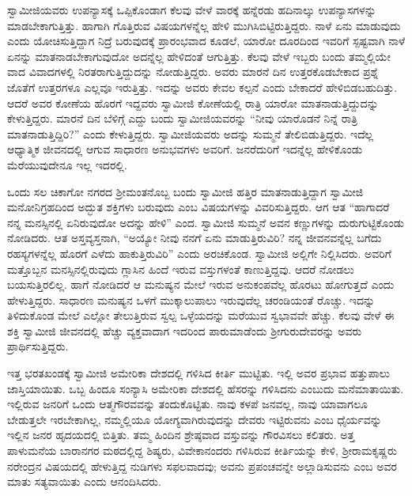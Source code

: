  ಸ್ವಾಮೀಜಿಯವರು ಉಪನ್ಯಾಸಕ್ಕೆ ಒಪ್ಪಿಕೊಂಡಾಗ ಕೆಲವು ವೇಳೆ ವಾರಕ್ಕೆ ಹನ್ನೆರಡು ಹದಿನಾಲ್ಕು ಉಪನ್ಯಾಸಗಳನ್ನು ಮಾಡಬೇಕಾಗುತ್ತಿತ್ತು. ಹಾಗಾಗಿ ಗೊತ್ತಿರುವ ವಿಷಯಗಳನ್ನೆಲ್ಲ ಹೇಳಿ ಮುಗಿಸಿಬಿಟ್ಟಿರುತ್ತಿದ್ದರು. ನಾಳೆ ಏನು ಮಾಡುವುದು ಎಂದು ಯೋಚಿಸುತ್ತಿದ್ದಾಗ ನಿದ್ರೆ ಬರುವುದಕ್ಕೆ ಪ್ರಾರಂಭವಾದ ಕೂಡಲೆ, ಯಾರೋ‌ ದೂರದಿಂದ ಇವರಿಗೆ ಸ್ಪಷ್ಟವಾಗಿ ನಾಳೆ ಏನನ್ನು ಮಾತನಾಡಬೇಕಾಗುವುದೋ ಅದನ್ನೆಲ್ಲ ಹೇಳಿದಂತೆ ಆಗುತ್ತಿತ್ತು. ಕೆಲವು ವೇಳೆ ಇಬ್ಬರು ಬಂದು ತಮ್ಮಲ್ಲಿಯೇ ವಾದ ವಿವಾದಗಳಲ್ಲಿ ನಿರತರಾಗುತ್ತಿದ್ದುದನ್ನು ನೋಡುತ್ತಿದ್ದರು. ಅವರು ಮಾರನೆ ದಿನ ಉತ್ತರಕೊಡಬೇಕಾದ ಪ್ರಶ್ನೆ ಜೊತೆಗೆ ಉತ್ತರಗಳೂ ಎಲ್ಲವೂ ಇರುತ್ತಿತ್ತು. ಇದನ್ನು ಅವರು ಕೇವಲ ಕಲ್ಪನೆ ಎಂದು ಬೇಕಾದರೆ ಹೇಳಿಬಿಡಬಹುದಿತ್ತು. ಆದರೆ ಅವರ ಕೋಣೆಯ ಹೊರಗೆ ಇದ್ದವರು ಸ್ವಾಮೀಜಿ ಕೋಣೆಯಲ್ಲಿ ರಾತ್ರಿ ಯಾರೋ ಮಾತನಾಡುತ್ತಿದ್ದುದನ್ನು ಕೇಳುತ್ತಿದ್ದರು. ಮಾರನೆ ದಿನ ಬೆಳಿಗ್ಗೆ ಎದ್ದು ಬಂದು ಸ್ವಾಮೀಜಿಯವರನ್ನು “ನೀವು ಯಾರೊಡನೆ ನಿನ್ನೆ ರಾತ್ರಿ ಮಾತನಾಡುತ್ತಿದ್ದಿರಿ?” ಎಂದು ಕೇಳುತ್ತಿದ್ದರು. ಸ್ವಾಮೀಜಿಯವರು ಅದನ್ನು ಸುಮ್ಮನೆ ತೇಲಿಬಿಡುತ್ತಿದ್ದರು. ಇದೆಲ್ಲ ಆಧ್ಯಾತ್ಮಿಕ ಜೀವನದಲ್ಲಿ ಆಗುವ ಸಾಧಾರಣ ಅನುಭವಗಳು ಅವರಿಗೆ. ಜನರೆದುರಿಗೆ ಇದನ್ನೆಲ್ಲ ಹೇಳಿಕೊಂಡು ಮೆರೆಯುವುದೇನೂ ಇಲ್ಲ ಇದರಲ್ಲಿ. 

 ಒಂದು ಸಲ ಚಿಕಾಗೋ ನಗರದ ಶ‍್ರೀಮಂತನೊಬ್ಬ ಬಂದು ಸ್ವಾಮೀಜಿ ಹತ್ತಿರ ಮಾತನಾಡುತ್ತಿದ್ದಾಗ ಸ್ವಾಮೀಜಿ ಮನೋನಿಗ್ರಹದಿಂದ ಅದ್ಭುತ ಶಕ್ತಿಗಳು ಬರುವುದು ಎಂಬ ವಿಷಯಗಳನ್ನು ವಿವರಿಸುತ್ತಿದ್ದರು. ಆಗ ಆತ “ಹಾಗಾದರೆ ನನ್ನ ಮನಸ್ಸಿನಲ್ಲಿ ಏನಿರುವುದೋ ಅದನ್ನು ಹೇಳಿ” ಎಂದ. ಸ್ವಾಮೀಜಿ ಸುಮ್ಮನೆ ಅವನ ಕಣ್ಣುಗಳನ್ನು ದುರುಗುಟ್ಟಿಕೊಂಡು ನೋಡಿದರು. ಆತ ಅಸ್ತವ್ಯಸ್ತನಾಗಿ, “ಅಯ್ಯೋ ನೀವು ನನಗೆ ಏನು ಮಾಡುತ್ತಿರುವಿರಿ? ನನ್ನ ಜೀವನವನ್ನೆಲ್ಲ ಬಗೆದು ರಹಸ್ಯಗಳನ್ನೆಲ್ಲ ಹೊರಗೆ ಎಳೆದು ಹಾಕುತ್ತಿರುವಿರಿ” ಎಂದು ಅರಚಿಕೊಂಡ. ಸ್ವಾಮೀಜಿ ಅಲ್ಲಿಗೇ ನಿಲ್ಲಿಸಿದರು. ಅವರಿಗೆ ಮತ್ತೊಬ್ಬನ ಮನಸ್ಸಿನಲ್ಲಿರುವುದು ಗ್ಲಾಸಿನ ಹಿಂದೆ ಇರುವ ವಸ್ತುಗಳಂತೆ ಕಾಣುತ್ತಿದ್ದವು. ಆದರೆ ನೋಡಲು ಬಯಸುತ್ತಿರಲಿಲ್ಲ. ಹಾಗೆ ನೋಡಿದರೆ ಆ ಮನುಷ್ಯನ ಮೇಲೆ ಇರುವ ಅನುಕಂಪವೆಲ್ಲ ಹೊರಟು ಹೋಗುತ್ತದೆ ಎಂದು ಹೇಳುತ್ತಿದ್ದರು. ಸಾಧಾರಣ ಮನುಷ್ಯನ ಒಳಗೆ ಮುಕ್ಕಾಲುಪಾಲು ಇರುವುದೆಲ್ಲ ಚರಂಡಿಯಂತೆ ರೊಚ್ಚು. ಇದನ್ನು ತಿಳಿದುಕೊಂಡ ಮೇಲೆ ಎಲ್ಲೋ ತೇಲುತ್ತಿರುವ ಸ್ವಲ್ಪ ಒಳ್ಳೆಯದನ್ನು ಮರೆಯುವ ಸ್ವಭಾವವೇ ಹೆಚ್ಚು. ಕೆಲವು ವೇಳೆ ಈ ಶಕ್ತಿ ಸ್ವಾಮೀಜಿ ಜೀವನದಲ್ಲಿ ಹೆಚ್ಚು ವ್ಯಕ್ತವಾದಾಗ ಇದರಿಂದ ಪಾರುಮಾಡೆಂದು ಶ‍್ರೀಗುರುದೇವರನ್ನು ಅವರು ಪ್ರಾರ್ಥಿಸುತ್ತಿದ್ದರು. 

 ಇತ್ತ ಭರತಖಂಡಕ್ಕೆ ಸ್ವಾಮೀಜಿ ಅಮೇರಿಕಾ ದೇಶದಲ್ಲಿ ಗಳಿಸಿದ ಕೀರ್ತಿ ಮುಟ್ಟಿತು. ಇಲ್ಲಿ ಅವರ ಪ್ರಭಾವ ಹತ್ತುಪಾಲು ಜಾಸ್ತಿಯಾಯಿತು. ಒಬ್ಬ ಹಿಂದೂ ಸಂನ್ಯಾಸಿ ಅಮೇರಿಕಾ ದೇಶದಲ್ಲಿ ಹೆಸರನ್ನು ಗಳಿಸಿದನು ಎಂಬುದು ಮನೆಮಾತಾಯಿತು. ಇಲ್ಲಿರುವ ಜನರಿಗೆ ಒಂದು ಆತ್ಮಗೌರವವನ್ನು ತಂದುಕೊಟ್ಟಿತು. ನಾವು ಕಳಪೆ ಜನವಲ್ಲ, ನಾವು ಯಾವಾಗಲೂ ಬೇಡುತ್ತಲೇ ಇರಬೇಕಾಗಿಲ್ಲ, ನಮ್ಮಲ್ಲಿಯೂ ಯೋಗ್ಯವಾಗಿರುವುದನ್ನು ದೇವರು ಇಟ್ಟಿರುವನು ಎಂಬ ಧೈರ್ಯವನ್ನು ಇಲ್ಲಿನ ಜನರ ಹೃದಯದಲ್ಲಿ ಬಿತ್ತಿತು. ತಮ್ಮ ಹಿಂದಿನ ಶ್ರೇಷ್ಠವಾದ ವಸ್ತುವನ್ನು ಗೌರವಿಸಲು ಕಲಿತರು. ಅತ್ತ ಪಾಳುಮನೆಯ ಬಾರಾನಗರ ಮಠದಲ್ಲಿದ್ದ ಶಿಷ್ಯರು, ವಿವೇಕಾನಂದರು ಗಳಿಸಿರುವ ಕೀರ್ತಿಯನ್ನು ಕೇಳಿ, ಶ‍್ರೀರಾಮಕೃಷ್ಣರು ನರೇಂದ್ರನ ವಿಷಯದಲ್ಲಿ ಹೇಳುತ್ತಿದ್ದ ನುಡಿಗಳು ಸಫಲವಾದವು; ಅವನು ಪ್ರಪಂಚವನ್ನೇ ಅಲ್ಲಾಡಿಸುವನು ಎಂಬ ಅವರ ಮಾತು ಸತ್ಯವಾಯಿತು ಎಂದು ಆನಂದಿಸಿದರು. 

